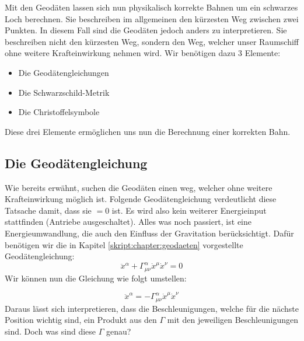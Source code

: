 \begin{refsection}
	Mit den Geodäten lassen sich nun physikalisch korrekte Bahnen um ein schwarzes Loch berechnen. Sie beschreiben im allgemeinen den kürzesten Weg zwischen zwei Punkten. In diesem Fall sind die Geodäten jedoch anders zu interpretieren. Sie beschreiben nicht den kürzesten Weg, sondern den Weg, welcher unser Raumschiff ohne weitere Krafteinwirkung nehmen wird.
	Wir benötigen dazu 3 Elemente:
	\begin{itemize}
		\item Die Geodätengleichungen
		\item Die Schwarzschild-Metrik
		\item Die Christoffelsymbole
	\end{itemize}
	Diese drei Elemente ermöglichen uns nun die Berechnung einer korrekten Bahn.

	\subsection{Die Geodätengleichung}\label{skript:chapter:zeitreisen:geodaetengl}
	
	Wie bereits erwähnt, suchen die Geodäten einen weg, welcher ohne weitere Krafteinwirkung möglich ist.
	Folgende Geodätengleichung verdeutlicht diese Tatsache damit, dass sie $=0$ ist. Es wird also kein weiterer Energieinput stattfinden (Antriebe ausgeschaltet). Alles was noch passiert, ist eine Energieumwandlung, die auch den Einfluss der Gravitation berücksichtigt. 
	Dafür benötigen wir die in Kapitel \ref{skript:chapter:geodaeten}
	vorgestellte Geodätengleichung:	
	\begin{equation}
	\ddot{x}^{\alpha} + \Gamma^{\alpha}_{\mu\nu}\dot{x}^{\mu}\dot{x}^{\nu} = 0
	\end{equation}
	Wir k\"onnen nun die Gleichung wie folgt umstellen:	
	
	\begin{equation}
	\ddot{x}^{\alpha} = -\Gamma^{\alpha}_{\mu\nu}\dot{x}^{\mu}\dot{x}^{\nu}
	\end{equation}
	Daraus lässt sich interpretieren, dass die Beschleunigungen, welche für die nächste Position wichtig sind, ein Produkt aus den $\Gamma$ mit den jeweiligen Beschleunigungen sind.
	Doch was sind diese $\Gamma$ genau?
	

\end{refsection}
